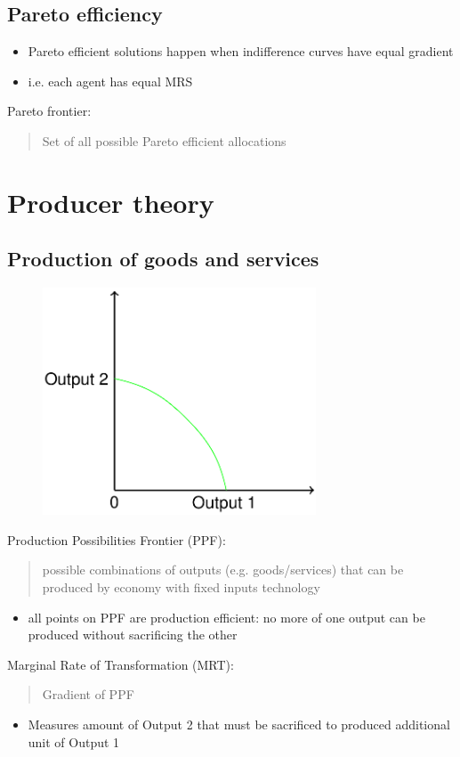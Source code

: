 \subsection{Pareto efficiency}
\begin{itemize}
  \item Pareto efficient solutions happen when indifference curves have equal gradient
  \item i.e. each agent has equal MRS
\end{itemize}
Pareto frontier:
\begin{quote}
  Set of all possible Pareto efficient allocations
\end{quote}
\section{Producer theory}
\subsection{Production of goods and services}
\begin{figure}[H]
  \centering
  \includegraphics[width =0.5 \textwidth]{./img/figure8.png}
  \caption{}
\end{figure}
Production Possibilities Frontier (PPF):
\begin{quote}
  possible combinations of outputs (e.g. goods/services) that can be produced by economy with fixed inputs technology
\end{quote}
\begin{itemize}
  \item all points on PPF are production efficient: no more of one output can be produced without sacrificing the other
\end{itemize}
Marginal Rate of Transformation (MRT):
\begin{quote}
  Gradient of PPF
\end{quote}
\begin{itemize}
  \item Measures amount of Output 2 that must be sacrificed to produced additional unit of Output 1
\end{itemize}
